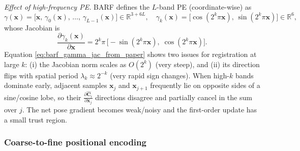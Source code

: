 \begin{enrichment}
\begin{enrichment}
        \medskip
        \noindent\textit{Effect of high-frequency PE.}
        BARF defines the $L$-band PE (coordinate-wise) as
        \[
        \gamma(\mathbf{x})
        =
        \big[\mathbf{x},\,\gamma_0(\mathbf{x}),\,\ldots,\,\gamma_{L-1}(\mathbf{x})\big]\in\mathbb{R}^{3+6L},\quad
        \gamma_k(\mathbf{x})=\big[\cos(2^k\pi\mathbf{x}),\,\sin(2^k\pi\mathbf{x})\big]\in\mathbb{R}^{6},
        \]
        whose Jacobian is
        \begin{equation}
            \frac{\partial \gamma_k(\mathbf{x})}{\partial \mathbf{x}}
            =
            2^k\pi\,\big[-\sin(2^k\pi\mathbf{x}),\;\cos(2^k\pi\mathbf{x})\big].
            \label{eq:barf_gamma_jac_from_paper}
        \end{equation}
        Equation \eqref{eq:barf_gamma_jac_from_paper} shows two issues for registration at large $k$: (i) the Jacobian norm scales as $O(2^k)$ (very steep), and (ii) its direction flips with spatial period $\lambda_k\!\approx\!2^{-k}$ (very rapid sign changes). When high-$k$ bands dominate early, adjacent samples $\mathbf{x}_{j}$ and $\mathbf{x}_{j+1}$ frequently lie on opposite sides of a sine/cosine lobe, so their
        $\frac{\partial \widehat{\mathbf{C}}_i}{\partial \mathbf{x}_{j}}$ directions disagree and partially cancel in the sum over $j$.
        The net pose gradient becomes weak/noisy and the first-order update has a small trust region.
        
        \subsubsection{Coarse-to-fine positional encoding}
        \label{subsubsec:chapter23_barf_c2f_pe}
        

\end{enrichment}
\end{enrichment}
